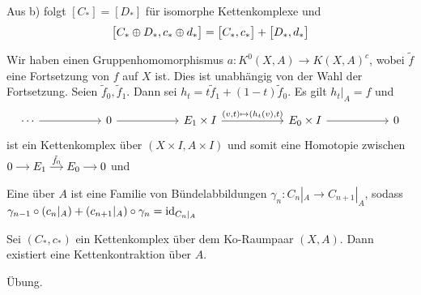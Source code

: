 

\begin{bemerkung}
Aus b) folgt $[C_*] = [D_*]$ für isomorphe Kettenkomplexe und 
\[
	\benbrace[\big]{C_* \oplus  D_*, c_* \oplus d_*} = \benbrace[\big]{C_*,c_*} + \benbrace[\big]{D_*,d_*}
\]	
\end{bemerkung}

Wir haben einen Gruppenhomomorphismus $a \colon K^0(X,A) \to K(X,A)^c$, 
wobei $\tilde{f}$ eine Fortsetzung von $f$ auf $X$ ist. Dies ist unabhängig von der Wahl der Fortsetzung. Seien $\tilde{f}_0, \tilde{f}_1$. Dann sei 
$h_t = t \tilde{f}_1 + (1-t) \tilde{f}_0$. Es gilt $h_t|_A =f$ und 
\[
	\begin{tikzcd}[sep=5.5em]
		\cdots \rar & 0  \rar & E_1 \times I \rar["{(v,t) \mapsto (h_t(v),t)}"] & E_0 \times I \rar & 0
	\end{tikzcd}
\]
ist ein Kettenkomplex über $(X \times I, A \times I)$ und somit eine Homotopie zwischen 
$\begin{tikzcd}[cramped,sep=small]0 \rar & E_1 \rar["\tilde{f}_0"] & E_0 \rar & 0\end{tikzcd}$ und 


\begin{definition}[label=sub:def_312]
Eine  über $A$ ist eine Familie von Bündelabbildungen $\gamma_n \colon C_n|_A \to C_{n+1}|_{A}$, sodass 
$\gamma_{n-1} \circ (c_n|_A) + (c_{n+1}|_A) \circ \gamma_n = \id_{C_n|_A}$ 
\end{definition}


\begin{lemma}[label=sub:lemma_3_1_3]
Sei $(C_*,c_*)$ ein Kettenkomplex über dem Ko-Raumpaar $(X,A)$. Dann existiert eine Kettenkontraktion über $A$.	
\end{lemma}
\begin{beweis}
Übung.
\end{beweis}



